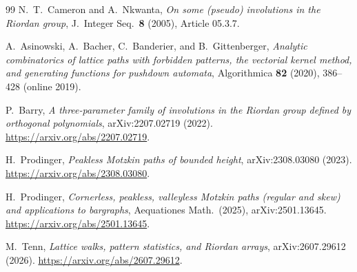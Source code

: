 \documentclass[11pt]{article}
\theoremstyle{definition}
\begin{document}
\begin{thebibliography}{99}
N.~T.\ Cameron and A.\ Nkwanta, \emph{On some (pseudo) involutions in the Riordan group}, J.\ Integer Seq.\ \textbf{8} (2005), Article 05.3.7.

A.\ Asinowski, A.\ Bacher, C.\ Banderier, and B.\ Gittenberger, \emph{Analytic combinatorics of lattice paths with forbidden patterns, the vectorial kernel method, and generating functions for pushdown automata}, Algorithmica \textbf{82} (2020), 386--428 (online 2019).

P.\ Barry, \emph{A three-parameter family of involutions in the Riordan group defined by orthogonal polynomials}, arXiv:2207.02719 (2022). \url{https://arxiv.org/abs/2207.02719}.

H.\ Prodinger, \emph{Peakless Motzkin paths of bounded height}, arXiv:2308.03080 (2023). \url{https://arxiv.org/abs/2308.03080}.

H.\ Prodinger, \emph{Cornerless, peakless, valleyless Motzkin paths (regular and skew) and applications to bargraphs}, Aequationes Math.\ (2025), arXiv:2501.13645. \url{https://arxiv.org/abs/2501.13645}.

M.\ Tenn, \emph{Lattice walks, pattern statistics, and Riordan arrays}, arXiv:2607.29612 (2026). \url{https://arxiv.org/abs/2607.29612}.

\end{thebibliography}
\end{document}

